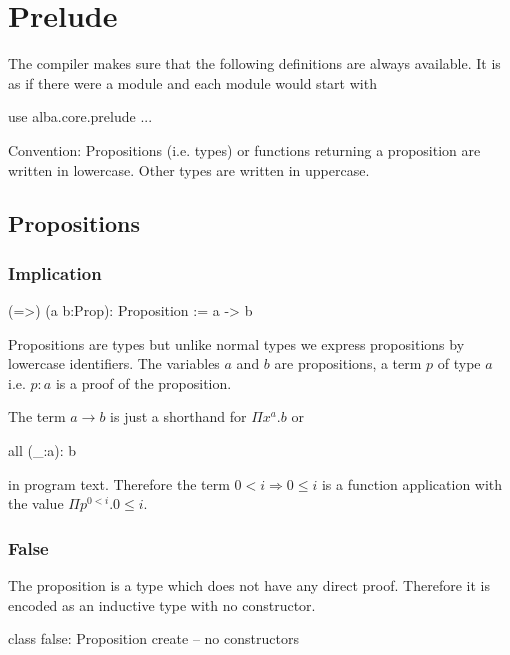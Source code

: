 \section{Prelude}

The compiler makes sure that the following definitions are always
available. It is as if there were a module  and each
module would start with
\begin{alba}
  use
     alba.core.prelude
     ...
\end{alba}


Convention: Propositions (i.e. types) or functions returning a proposition are
written in lowercase. Other types are written in uppercase.



\subsection{Propositions}
\label{sec:prelude-propositions}


\subsubsection{Implication}
%
\begin{alba}
  (=>) (a b:Prop): Proposition
    := a -> b
\end{alba}

Propositions are types but unlike normal types we express propositions by
lowercase identifiers. The variables $a$ and $b$ are propositions, a term $p$
of type $a$ i.e. $p:a$ is a proof of the proposition.

The term $a\to b$ is just a shorthand for $\Pi x^a.b$ or
\begin{alba}
  all (_:a): b
\end{alba}
in program text. Therefore the term $0 < i \Rightarrow 0 \le i$ is a function
application with the value $\Pi p^{0 < i}. 0 \le i$.
\newline





\subsubsection{False}

The proposition  is a type which does not have any direct
proof. Therefore it is encoded as an inductive type with no constructor.
%
\begin{alba}
  class
    false: Proposition
  create
    -- no constructors
\end{alba}

